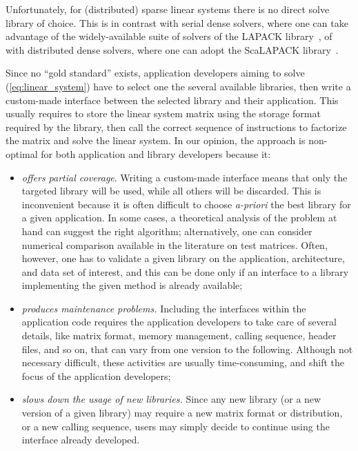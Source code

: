 \documentclass[acmtocl]{acmtrans2m}
\begin{document}
Unfortunately, for (distributed) sparse linear systems there is no direct
solve library of choice. This is in contrast with serial dense solvers, where
one can take advantage of the widely-available suite of solvers of the LAPACK 
library~\cite{lapack-guide}, of with distributed dense solvers, where one can
adopt the ScaLAPACK library~\cite{scalapack-guide}.

Since no ``gold standard'' exists, application developers aiming to solve
(\ref{eq:linear_system}) have to select one the several available libraries,
  then write a custom-made interface between the selected library and
  their application. This usually requires to store the linear system matrix using the
  storage format required by the library, then call the correct sequence of
  instructions to factorize the matrix and solve the linear system.  In our
  opinion, the approach is non-optimal for both application and library
  developers because it:
\begin{itemize}

\item 
{\sl offers partial coverage}. Writing a custom-made interface means that only the
targeted library will be used, while all others will be discarded.
This is inconvenient because 
it is often difficult to choose {\sl a-priori} the best library for a given
application.
In some cases, a theoretical analysis of
the problem at hand can suggest the right algorithm; alternatively, one can
consider numerical comparison available in the literature
on test matrices. Often, however, one has to validate
a given library on the application, architecture, and data
set of interest, and this can be done only if an interface  to a library
implementing the given method is already available;

\item 
{\sl produces maintenance problems.}
Including the interfaces within the application code requires the application
developers to take care of several details, like matrix format, memory
management, calling sequence, header files, and so on, that can vary 
from one version to the following. Although not necessary difficult, these
activities are usually time-consuming, and shift the focus of the application
developers;

\item 
{\sl slows down the usage of new libraries.} Since any new library 
(or a new version of a given library) may require a new matrix format or
distribution, or a new calling sequence, users may simply decide to continue
using the interface already developed.
\end{itemize}
\end{document}

